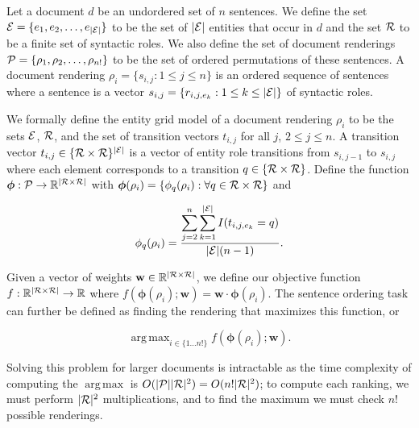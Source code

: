 \documentclass{article}
\newcommand{\entities}{{\cal E}}
\newcommand{\ent}{e}
\newcommand{\roles}{{\cal R}}
\newcommand{\role}{r}
\newcommand{\tv}{t}
\newcommand{\sent}{s}
\newcommand{\weight}{\mathbf{w}}
\newcommand{\rend}{\rho}
\newcommand{\Rend}{{\cal P}}
\newcommand{\trans}{q}
\newcommand{\obj}{f}
\newcommand{\EnumS}[2]{\{#1 \ldots #2\}}
\DeclareMathOperator*{\argmax}{arg\,max}
\newcommand{\fmap}{\boldsymbol{\phi}}
\begin{document}
Let a document $d$ be an undordered set of $n$ sentences. 
We define the set $\entities = \{e_1,e_2,\ldots,e_{|\entities|}\}$ to be the set of $|\entities|$ entities that occur in $d$ and the set $\roles$ to be a finite set of syntactic roles. 
We also define the set of document renderings $\Rend = \{\rend_1,\rend_2,\ldots, \rend_{n!} \}$ to be the set of ordered permutations of these sentences. 
A document rendering $\rend_i = \{\sent_{i,j} : 1 \le j \le n \}$ is an ordered sequence of sentences where a sentence is a vector $\sent_{i,j} = \{\role_{i,j,\ent_k} : 1\le k \le |\entities| \}$ of syntactic roles.


We formally define the entity grid model of a document rendering $\rend_i$ to be the sets $\entities$, $\roles$, and the set of transition vectors $\tv_{i,j}$  for all $j$, $2 \le j \le n$. 
A transition vector $\tv_{i,j} \in \{\roles\times\roles\}^{|\entities|}$ is a vector of entity role transitions from $\sent_{i,j-1}$ to $\sent_{i,j}$ where each element corresponds to a transition  $\trans \in \{\roles\times\roles\}$.
Define the function $\fmap: \Rend \rightarrow \mathbb{R}^{| \roles \times \roles | }$ with $\fmap(\rend_i) = \{ \phi_\trans(\rend_i) : \forall \trans \in {\roles \times \roles}  \}$ and

\begin{equation}
\phi_\trans(\rend_i) = \frac{ \displaystyle \sum_{j = 2}^n \sum_{k=1}^{|\entities|} I(\tv_{i,j,e_k}= \trans)  }{|\entities|(n-1)}. 
\end{equation}


Given a vector of weights $\mathbf{w} \in \mathbb{R}^{|\roles\times\roles|}$, we define our objective function $\obj : \mathbb{R}^{|\roles\times\roles|}  \rightarrow \mathbb{R}$ where $\obj(\fmap(\rend_i);\weight) = \weight\cdot\fmap(\rend_i)$. 
The sentence ordering task can further be defined as finding the rendering that maximizes this function, or

\begin{equation}
    \argmax_{i \in \EnumS{1}{n!}} \obj(\boldsymbol{\phi}(\rend_i) ; \weight ).
\end{equation}


Solving this problem for larger documents is intractable as the time complexity of computing the $\argmax$ is $ O(|\Rend||\roles|^2) = O(n!|\roles|^2)$; to compute each ranking, we must perform $|\roles|^2$ multiplications, and to find the maximum we must check $n!$ possible renderings.
\end{document}
